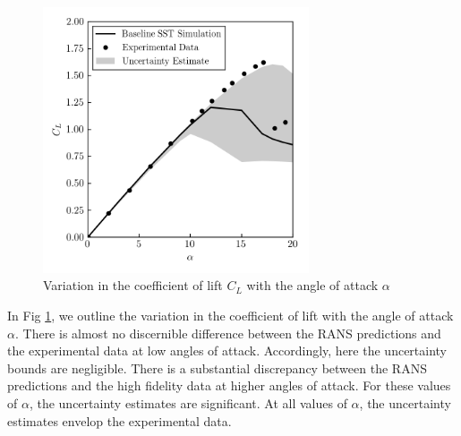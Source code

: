 \begin{figure}
\center
\includegraphics[width=0.7\textwidth]{suthesis/images/L6_ls_cl_vs_alpha_uq.png}
\caption{Variation in the coefficient of lift $C_L$ with the angle of attack $\alpha$\label{fig:naca0012_cl_vs_alpha}}
\end{figure}

In Fig \ref{fig:naca0012_cl_vs_alpha}, we outline the variation in the coefficient of lift with the angle of attack $\alpha$.
There is almost no discernible difference between the RANS predictions and the experimental data at low angles of attack.
Accordingly, here the uncertainty bounds are negligible.
There is a substantial discrepancy between the RANS predictions and the high fidelity data at higher angles of attack.
For these values of $\alpha$, the uncertainty estimates are significant.
At all values of $\alpha$, the uncertainty estimates envelop the experimental data. 

